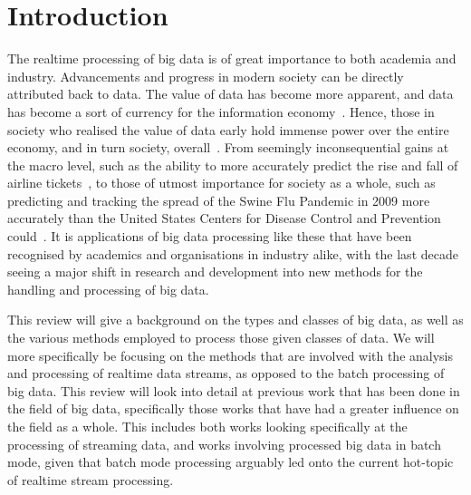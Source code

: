 \documentclass[a4paper,11pt]{article}
\begin{document}



\section{Introduction} %
\label{sec:introduction}

The realtime processing of big data is of great importance to both academia and industry. Advancements and progress in
modern society can be directly attributed back to data. The value of data has become more apparent, and data has become
a sort of currency for the information economy~\cite{st2009examining}. Hence, those in society who realised the value of
data early hold immense power over the entire economy, and in turn society, overall~\cite{lievesley1993increasing}.
From seemingly inconsequential gains at the macro level, such as the ability to more
accurately predict the rise and fall of airline tickets~\cite{darlin2006airfares}, to those of utmost importance for
society as a whole, such as predicting and tracking the spread of the Swine Flu Pandemic in 2009 more accurately than
the United States Centers for Disease Control and Prevention could~\cite{ritterman2009using,mayer2013big}. It is
applications of big data processing like these that have been recognised by academics and organisations in
industry alike, with the last decade seeing a major shift in research and development into new methods for the handling
and processing of big data.

This review will give a background on the types and classes of big data, as well as the various methods employed to
process those given classes of data. We will more specifically be focusing on the methods that are involved with the
analysis and processing of realtime data streams, as opposed to the batch processing of big data. This review will look
into detail at previous work that has been done in the field of big data, specifically those works that have had a
greater influence on the field  as a whole. This includes both works looking specifically at the processing of streaming
data, and works involving processed big data in batch mode, given that batch mode processing arguably led onto the
current hot-topic of realtime stream processing.
\end{document}
